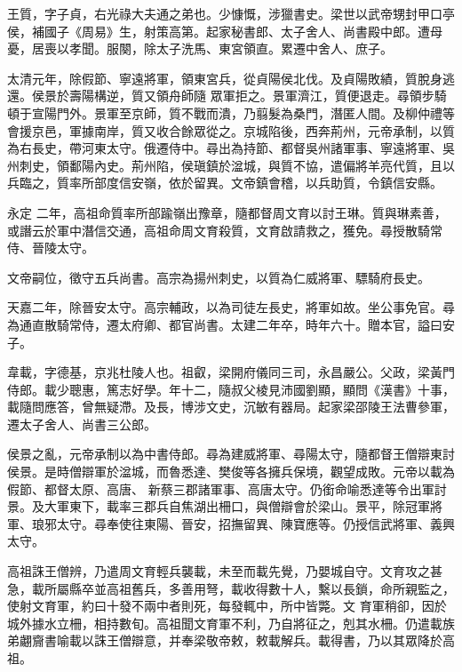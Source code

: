 \begin{pinyinscope}
 王質，字子貞，右光祿大夫通之弟也。少慷慨，涉獵書史。梁世以武帝甥封甲口亭侯，補國子《周易》生，射策高第。起家秘書郎、太子舍人、尚書殿中郎。遭母憂，居喪以孝聞。服闋，除太子洗馬、東宮領直。累遷中舍人、庶子。



 太清元年，除假節、寧遠將軍，領東宮兵，從貞陽侯北伐。及貞陽敗績，質脫身逃還。侯景於壽陽構逆，質又領舟師隨
 眾軍拒之。景軍濟江，質便退走。尋領步騎頓于宣陽門外。景軍至京師，質不戰而潰，乃翦髮為桑門，潛匿人間。及柳仲禮等會援京邑，軍據南岸，質又收合餘眾從之。京城陷後，西奔荊州，元帝承制，以質為右長史，帶河東太守。俄遷侍中。尋出為持節、都督吳州諸軍事、寧遠將軍、吳州刺史，領鄱陽內史。荊州陷，侯瑱鎮於湓城，與質不協，遣偏將羊亮代質，且以兵臨之，質率所部度信安嶺，依於留異。文帝鎮會稽，以兵助質，令鎮信安縣。



 永定
 二年，高祖命質率所部踰嶺出豫章，隨都督周文育以討王琳。質與琳素善，或譖云於軍中潛信交通，高祖命周文育殺質，文育啟請救之，獲免。尋授散騎常侍、晉陵太守。



 文帝嗣位，徵守五兵尚書。高宗為揚州刺史，以質為仁威將軍、驃騎府長史。



 天嘉二年，除晉安太守。高宗輔政，以為司徒左長史，將軍如故。坐公事免官。尋為通直散騎常侍，遷太府卿、都官尚書。太建二年卒，時年六十。贈本官，謚曰安子。



 韋載，字德基，京兆杜陵人也。祖叡，梁開府儀同三司，永昌嚴公。父政，梁黃門侍郎。載少聰惠，篤志好學。年十二，隨叔父棱見沛國劉顯，顯問《漢書》十事，載隨問應答，曾無疑滯。及長，博涉文史，沉敏有器局。起家梁邵陵王法曹參軍，遷太子舍人、尚書三公郎。



 侯景之亂，元帝承制以為中書侍郎。尋為建威將軍、尋陽太守，隨都督王僧辯東討侯景。是時僧辯軍於湓城，而魯悉達、樊俊等各擁兵保境，觀望成敗。元帝以載為假節、都督太原、高唐、
 新蔡三郡諸軍事、高唐太守。仍銜命喻悉達等令出軍討景。及大軍東下，載率三郡兵自焦湖出柵口，與僧辯會於梁山。景平，除冠軍將軍、琅邪太守。尋奉使往東陽、晉安，招撫留異、陳寶應等。仍授信武將軍、義興太守。



 高祖誅王僧辨，乃遣周文育輕兵襲載，未至而載先覺，乃嬰城自守。文育攻之甚急，載所屬縣卒並高祖舊兵，多善用弩，載收得數十人，繫以長鎖，命所親監之，使射文育軍，約曰十發不兩中者則死，每發輒中，所中皆斃。文
 育軍稍卻，因於城外據水立柵，相持數旬。高祖聞文育軍不利，乃自將征之，剋其水柵。仍遣載族弟翽齎書喻載以誅王僧辯意，并奉梁敬帝敕，敕載解兵。載得書，乃以其眾降於高祖。




\end{pinyinscope}
